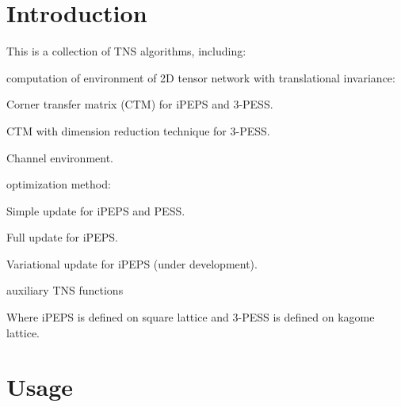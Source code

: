 \hypertarget{index_Introduction}{}\section{Introduction}\label{index_Introduction}
This is a collection of T\+NS algorithms, including\+:


\begin{DoxyItemize}
\item computation of environment of 2D tensor network with translational invariance\+:
\begin{DoxyItemize}
\item Corner transfer matrix (C\+TM) for i\+P\+E\+PS and 3-\/\+P\+E\+SS.
\item C\+TM with dimension reduction technique for 3-\/\+P\+E\+SS.
\item Channel environment.
\end{DoxyItemize}
\item optimization method\+:
\begin{DoxyItemize}
\item Simple update for i\+P\+E\+PS and P\+E\+SS.
\item Full update for i\+P\+E\+PS.
\item Variational update for i\+P\+E\+PS (under development).
\end{DoxyItemize}
\item auxiliary T\+NS functions
\end{DoxyItemize}

Where i\+P\+E\+PS is defined on square lattice and 3-\/\+P\+E\+SS is defined on kagome lattice. \hypertarget{index_Usage}{}\section{Usage}\label{index_Usage}

